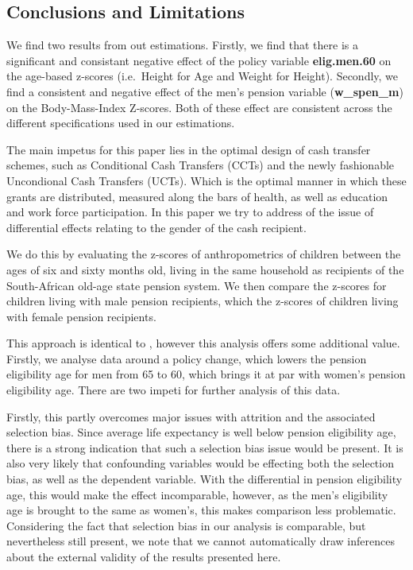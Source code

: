 \begin{refsection}
\section{Conclusions and Limitations}
We find two results from out estimations.
Firstly, we find that there is a significant and consistant negative effect of the policy variable \textbf{elig.men.60} on the age-based z-scores
(i.e.~Height for Age and Weight for Height).
Secondly, we find a consistent and negative effect of the men's pension variable (\textbf{w\_spen\_m}) on the Body-Mass-Index Z-scores.
Both of these effect are consistent across the different specifications used in our estimations.

The main impetus for this paper lies in the optimal design of cash transfer schemes,
such as Conditional Cash Transfers (CCTs) and the newly fashionable Uncondional Cash Transfers (UCTs).
Which is the optimal manner in which these grants are distributed, measured along the bars of health,
as well as education and work force participation.
In this paper \parencite[like in][]{duflo2000child,duflo2003grandmothers} we try to address of the issue of differential effects relating to the gender of the cash recipient.

We do this by evaluating the z-scores of anthropometrics of children between the ages of six and sixty months old, living in the same household as recipients of the South-African old-age state pension system. We then compare the z-scores for children living with male pension recipients, which the z-scores of children living with female pension recipients.

This approach is identical to \textcite{duflo2000child,duflo2003grandmothers}, however this analysis offers some additional value.
Firstly, we analyse data around a policy change, which lowers the pension eligibility age for men from 65 to 60,
which brings it at par with women's pension eligibility age.
There are two impeti for further analysis of this data.

Firstly, this partly overcomes major issues with attrition and the associated selection bias.
Since average life expectancy is well below pension eligibility age,
there is a strong indication that such a selection bias issue would be present.
It is also very likely that confounding variables would be effecting both the selection bias, as well as the dependent variable.
With the differential in pension eligibility age, this would make the effect incomparable,
however, as the men's eligibility age is brought to the same as women's, this makes comparison less problematic.
Considering the fact that selection bias in our analysis is comparable, but nevertheless still present,
we note that we cannot automatically draw inferences about the external validity of the results presented here.


\end{refsection}
